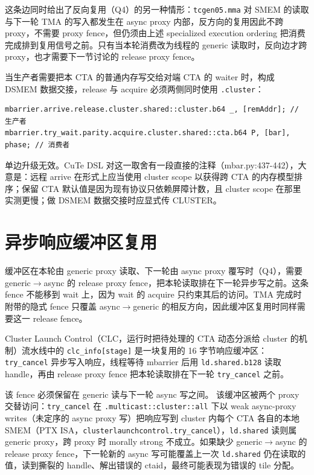 这条边同时给出了反向复用（Q4）的另一种情形：\lstinline|tcgen05.mma| 对 SMEM 的读取与下一轮 TMA 的写入都发生在 async proxy 内部，反方向的复用因此不跨 proxy，不需要 proxy fence，但仍须由上述 specialized execution ordering 把消费完成排到复用信号之前。只有当本轮消费改为线程的 generic 读取时，反向边才跨 proxy，也才需要下一节讨论的 release proxy fence。

当生产者需要把本 CTA 的普通内存写交给对端 CTA 的 waiter 时，构成 DSMEM 数据交接，release 与 acquire 必须两侧同时使用 \lstinline|.cluster|：

\begin{lstlisting}
mbarrier.arrive.release.cluster.shared::cluster.b64 _, [remAddr]; // 生产者
mbarrier.try_wait.parity.acquire.cluster.shared::cta.b64 P, [bar], phase; // 消费者
\end{lstlisting}

单边升级无效。CuTe DSL 对这一取舍有一段直接的注释（mbar.py:437-442），大意是：远程 arrive 在形式上应当使用 cluster scope 以获得跨 CTA 的内存模型排序；保留 CTA 默认值是因为现有协议只依赖屏障计数，且 cluster scope 在那里实测更慢；做 DSMEM 数据交接时应显式传 CLUSTER。

\section{异步响应缓冲区复用}

缓冲区在本轮由 generic proxy 读取、下一轮由 async proxy 覆写时（Q4），需要 generic$\rightarrow$async 的 release proxy fence，把本轮读取排在下一轮异步写之前。这条 fence 不能移到 wait 上，因为 wait 的 acquire 只约束其后的访问。TMA 完成时附带的隐式 fence 只覆盖 async$\rightarrow$generic 的相反方向，因此缓冲区复用时同样需要这一 release fence。

Cluster Launch Control（CLC，运行时把待处理的 CTA 动态分派给 cluster 的机制）流水线中的 \lstinline|clc_info[stage]| 是一块复用的 16 字节响应缓冲区：\lstinline|try_cancel| 异步写入响应，线程等待 mbarrier 后用 \lstinline|ld.shared.b128| 读取 handle，再由 release proxy fence 把本轮读取排在下一轮 \lstinline|try_cancel| 之前。

该 fence 必须保留在 generic 读与下一轮 async 写之间。 该缓冲区被两个 proxy 交替访问：\lstinline|try_cancel| 在 \lstinline|.multicast::cluster::all| 下以 weak async-proxy writes（未定序的 async proxy 写）把响应写到 cluster 内每个 CTA 各自的本地 SMEM（PTX ISA，\lstinline|clusterlaunchcontrol.try_cancel|），\lstinline|ld.shared| 读则属 generic proxy，跨 proxy 时 morally strong 不成立。如果缺少 generic$\rightarrow$async 的 release proxy fence，下一轮新的 async 写可能覆盖上一次 \lstinline|ld.shared| 仍在读取的值，读到撕裂的 handle、解出错误的 ctaid，最终可能表现为错误的 tile 分配。

